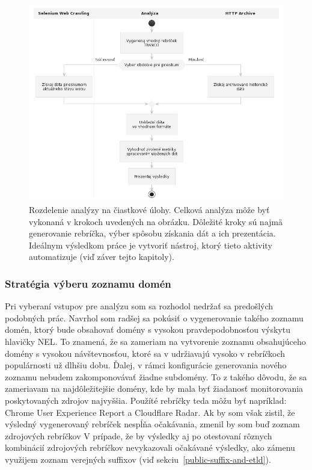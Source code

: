 \pagebreak

\begin{figure}[!htb]
\begin{center}
 \includegraphics[scale=0.48]{obrazky-figures/analysis-activity-diagram.png}    
 \caption{\centering Rozdelenie analýzy na čiastkové úlohy. Celková analýza môže byť vykonaná v krokoch uvedených na obrázku. Dôležité kroky sú najmä generovanie rebríčka, výber spôsobu získania dát a ich prezentácia. Ideálnym výsledkom práce je vytvoriť nástroj, ktorý tieto aktivity automatizuje (viď záver tejto kapitoly).}
 \label{img:analysis-activity-diagram}
\end{center}
\end{figure}

\subsubsection{Stratégia výberu zoznamu domén}

Pri vyberaní vstupov pre analýzu som sa rozhodol nedržať sa predošlých podobných prác.
Navrhol som radšej sa pokúsiť o vygenerovanie takého zoznamu domén, ktorý bude obsahovať domény 
s vysokou pravdepodobnosťou výskytu hlavičky NEL. 
To znamená, že sa zameriam na vytvorenie zoznamu obsahujúceho domény s vysokou návštevnosťou, ktoré sa v udržiavajú vysoko v rebríčkoch populárnosti už dlhšiu dobu.
Ďalej, v rámci konfigurácie generovania nového zoznamu nebudem zakomponovávať žiadne subdomény.
To z takého dôvodu, že sa zameriavam na najdôležitejšie domény, kde by mala byť žiadanosť 
monitorovania poskytovaných zdrojov najvyššia.
Použíté rebríčky teda môžu byť napríklad: Chrome User Experience Report a Cloudflare Radar.
Ak by som však zistil, že výsledný vygenerovaný rebríček nespĺňa očakávania, zmenil by som buď zoznam zdrojových rebríčkov
V prípade, že by výsledky aj po otestovaní rôznych kombinácií zdrojových rebríčkov nevykazovali očakávané výsledky, ako zámenu využijem zoznam verejných suffixov (viď \mbox{sekciu \ref{public-suffix-and-etld})}.

